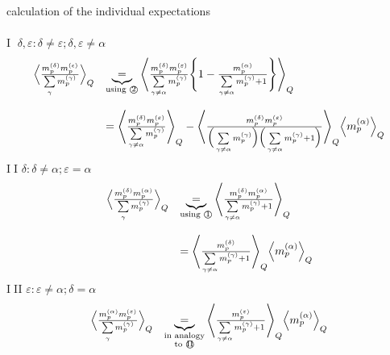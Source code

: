 \newpage
\noindent calculation of the individual expectations\\\\
\textcircled{I} $\delta, \varepsilon: \delta \neq \varepsilon; \delta, \varepsilon \neq \alpha$
\begin{equation}
	\begin{array}{ll}
	\Big< \frac{m_p^{(\delta)} m_p^{(\epsilon)}}{\sum\limits_\gamma
			m_p^{(\gamma)}} \Big>_Q
	& \underbrace{=}_{\text{using \textcircled{2}}} 
		\Bigg< \frac{m_p^{(\delta)} m_p^{(\varepsilon)}}{
				\sum\limits_{\gamma \neq \alpha}
				m_p^{(\gamma)}}
			\Bigg\{ 1 - \frac{m_p^{(\alpha)}}{
				\sum\limits_{\gamma \neq \alpha}
				m_p^{(\gamma)} + 1}
			\Bigg\}
		\Bigg>_Q \\\\
	& = \Bigg< \frac{m_p^{(\delta)} m_p^{(\varepsilon)}}{
				\sum\limits_{\gamma \neq \alpha}
				m_p^{(\gamma)}}
	\Bigg>_Q - \Bigg< \frac{m_p^{(\delta)} m_p^{(\varepsilon)}}{
		\Big(\sum\limits_{\gamma \neq \alpha} m_p^{(\gamma)} \Big)
		\Big(\sum\limits_{\gamma \neq \alpha} m_p^{(\gamma)} + 1 \Big)}
	\Bigg>_Q \Big< m_p^{(\alpha)} \Big>_Q
	\end{array}
\end{equation}
\textcircled{II} $\delta: \delta \neq \alpha; \varepsilon = \alpha$
\begin{equation}
	\begin{array}{ll}
	\Big< \frac{m_p^{(\delta)} m_p^{(\alpha)}}{\sum\limits_\gamma
			m_p^{(\gamma)}} \Big>_Q
	& \underbrace{=}_{\text{using \textcircled{1}}}
		\Bigg< \frac{m_p^{(\delta)} m_p^{(\alpha)}}{
			\sum\limits_{\gamma \neq \alpha}
			m_p^{(\gamma)} + 1}
		\Bigg>_Q \\\\
	& = \Bigg< \frac{m_p^{(\delta)}}{\sum\limits_{\gamma \neq \alpha}
			m_p^{(\gamma)} + 1}
	\Bigg>_Q \Big< m_p^{(\alpha)} \Big>_Q
	\end{array}
\end{equation}
\textcircled{III} $\varepsilon: \varepsilon \neq \alpha; \delta = \alpha$
\begin{equation}
	\begin{array}{ll}
	\Big< \frac{m_p^{(\alpha)} m_p^{(\varepsilon)}}{\sum\limits_\gamma
			m_p^{(\gamma)}} \Big>_Q
	& \underbrace{=}_{\substack{ \text{in analogy} \\ 
					\text{to \textcircled{II}}}}
		\Bigg< \frac{m_p^{(\varepsilon)}}{
				\sum\limits_{\gamma \neq \alpha}
				m_p^{(\gamma)} + 1}
		\Bigg>_Q \Big< m_p^{(\alpha)} \Big>_Q
	\end{array}
\end{equation}
